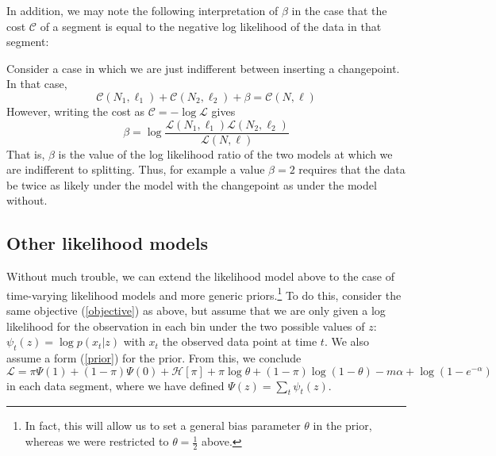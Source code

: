 \documentclass[11pt]{article}
\begin{document}
In addition, we may note the following interpretation of $\beta$ in the case that the cost $\mathcal{C}$ of a segment is equal to the negative log likelihood of the data in that segment:

Consider a case in which we are just indifferent between inserting a changepoint. In that case,
\begin{equation}
    \mathcal{C}(N_1, \ell_1) + \mathcal{C}(N_2, \ell_2) + \beta = \mathcal{C}(N, \ell)
\end{equation}
However, writing the cost as $\mathcal{C} = -\log \mathcal{L}$ gives
\begin{equation}
    \beta = \log \frac{\mathcal{L}(N_1, \ell_1)\mathcal{L}(N_2, \ell_2)}{\mathcal{L}(N, \ell)}
\end{equation}
That is, $\beta$ is the value of the log likelihood ratio of the two models at which we are indifferent to splitting. Thus, for example a value $\beta = 2$ requires that the data be twice as likely under the model with the changepoint as under the model without.

\subsection{Other likelihood models}
\label{generic_derivation}
Without much trouble, we can extend the likelihood model above to the case of time-varying likelihood models and more generic priors.\footnote{In fact, this will allow us to set a general bias parameter $\theta$ in the prior, whereas we were restricted to $\theta = \frac{1}{2}$ above.} To do this, consider the same objective (\ref{objective}) as above, but assume that we are only given a log likelihood for the observation in each bin under the two possible values of $z$: $\psi_t(z) = \log p(x_t|z)$ with $x_t$ the observed data point at time $t$. We also assume a form (\ref{prior}) for the prior. From this, we conclude
\begin{equation}
    \mathcal{L} = \pi \Psi(1) + (1 - \pi) \Psi(0) + \mathcal{H}[\pi] +
    \pi \log \theta + (1 - \pi) \log (1 - \theta) - m\alpha + \log (1 - e^{-\alpha})
\end{equation}
in each data segment, where we have defined $\Psi(z) = \sum_t \psi_t(z)$.
\end{document}
